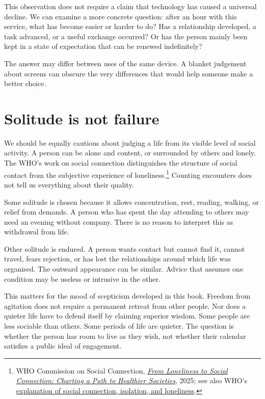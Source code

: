 \documentclass[12pt,a4paper]{book}
\begin{document}
This observation does not require a claim that technology has caused a universal decline. We can examine a more concrete question: after an hour with this service, what has become easier or harder to do? Has a relationship developed, a task advanced, or a useful exchange occurred? Or has the person mainly been kept in a state of expectation that can be renewed indefinitely?

The answer may differ between uses of the same device. A blanket judgement about screens can obscure the very differences that would help someone make a better choice.

\section*{Solitude is not failure}

We should be equally cautious about judging a life from its visible level of social activity. A person can be alone and content, or surrounded by others and lonely. The WHO's work on social connection distinguishes the structure of social contact from the subjective experience of loneliness.\footnote{WHO Commission on Social Connection, \href{https://www.who.int/groups/commission-on-social-connection/report}{\emph{From Loneliness to Social Connection: Charting a Path to Healthier Societies}}, 2025; see also WHO's \href{https://www.who.int/news-room/questions-and-answers/item/social-connection}{explanation of social connection, isolation, and loneliness}.} Counting encounters does not tell us everything about their quality.

Some solitude is chosen because it allows concentration, rest, reading, walking, or relief from demands. A person who has spent the day attending to others may need an evening without company. There is no reason to interpret this as withdrawal from life.

Other solitude is endured. A person wants contact but cannot find it, cannot travel, fears rejection, or has lost the relationships around which life was organised. The outward appearance can be similar. Advice that assumes one condition may be useless or intrusive in the other.

This matters for the mood of scepticism developed in this book. Freedom from agitation does not require a permanent retreat from other people. Nor does a quieter life have to defend itself by claiming superior wisdom. Some people are less sociable than others. Some periods of life are quieter. The question is whether the person has room to live as they wish, not whether their calendar satisfies a public ideal of engagement.
\end{document}
